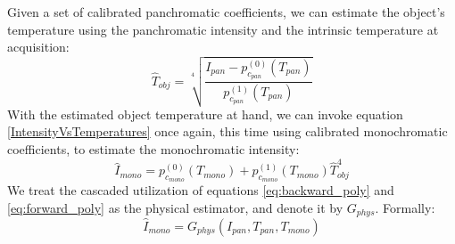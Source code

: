 Given a set of calibrated panchromatic coefficients, we can estimate the object's temperature using the panchromatic intensity and the intrinsic temperature at acquisition:
\begin{equation} \label{eq:backward_poly}
  \hat{T}_\mathit{obj} = \sqrt[4]{\frac{I_\mathit{pan} - p^{(0)}_{c_\mathit{pan}}(T_\mathit{pan})}{p^{(1)}_{c_\mathit{pan}}(T_\mathit{pan})}}
\end{equation}
With the estimated object temperature at hand, we can invoke equation \ref{IntensityVsTemperatures} once again, this time using calibrated monochromatic coefficients, to estimate the monochromatic intensity:
\begin{equation} \label{eq:forward_poly}
  \hat{I}_\mathit{mono} = p^{(0)}_{c_\mathit{mono}}(T_\mathit{mono}) + p^{(1)}_{c_\mathit{mono}}(T_\mathit{mono}) \hat{T}_\mathit{obj}^4
\end{equation}
We treat the cascaded utilization of equations \ref{eq:backward_poly} and \ref{eq:forward_poly} as the physical estimator, and denote it by $G_{\mathit{phys}}$. Formally:
\begin{equation}
  \hat{I}_\mathit{mono} = G_{\mathit{phys}}(I_\mathit{pan}, T_\mathit{pan}, T_\mathit{mono})
\end{equation}

